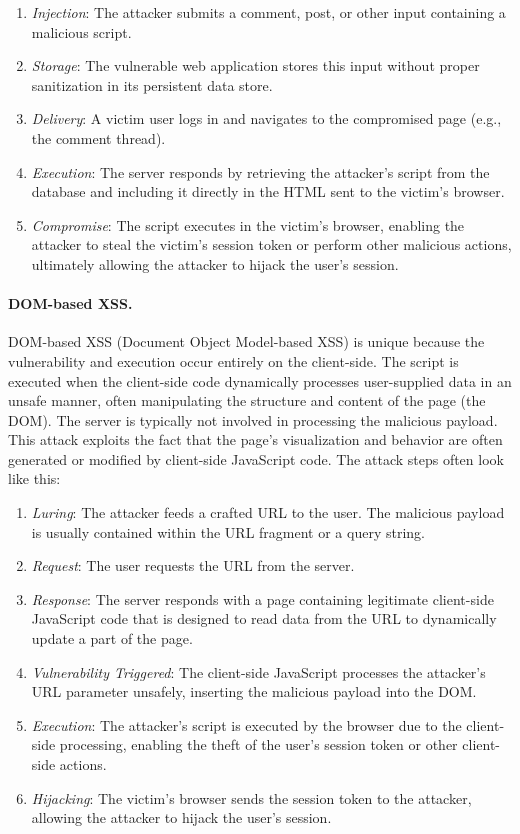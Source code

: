 \begin{enumerate}
    \item \textit{Injection}: The attacker submits a comment, post, or other input containing a malicious script.
    \item \textit{Storage}: The vulnerable web application stores this input without proper sanitization in its persistent data store.
    \item \textit{Delivery}: A victim user logs in and navigates to the compromised page (e.g., the comment thread).
    \item \textit{Execution}: The server responds by retrieving the attacker's script from the database and including it directly in the HTML sent to the victim's browser.
    \item \textit{Compromise}: The script executes in the victim's browser, enabling the attacker to steal the victim's session token or perform other malicious actions, ultimately allowing the attacker to hijack the user's session.
\end{enumerate}

\paragraph{DOM-based XSS.} DOM-based XSS (Document Object Model-based XSS) is unique because the vulnerability and execution occur entirely on the client-side. The script is executed when the client-side code dynamically processes user-supplied data in an unsafe manner, often manipulating the structure and content of the page (the DOM). The server is typically not involved in processing the malicious payload. This attack exploits the fact that the page's visualization and behavior are often generated or modified by client-side JavaScript code. The attack steps often look like this:

\begin{enumerate}
    \item \textit{Luring}: The attacker feeds a crafted URL to the user. The malicious payload is usually contained within the URL fragment or a query string.
    \item \textit{Request}: The user requests the URL from the server.
    \item \textit{Response}: The server responds with a page containing legitimate client-side JavaScript code that is designed to read data from the URL to dynamically update a part of the page.
    \item \textit{Vulnerability Triggered}: The client-side JavaScript processes the attacker's URL parameter unsafely, inserting the malicious payload into the DOM.
    \item \textit{Execution}: The attacker's script is executed by the browser due to the client-side processing, enabling the theft of the user's session token or other client-side actions.
    \item \textit{Hijacking}: The victim's browser sends the session token to the attacker, allowing the attacker to hijack the user's session.
\end{enumerate}


